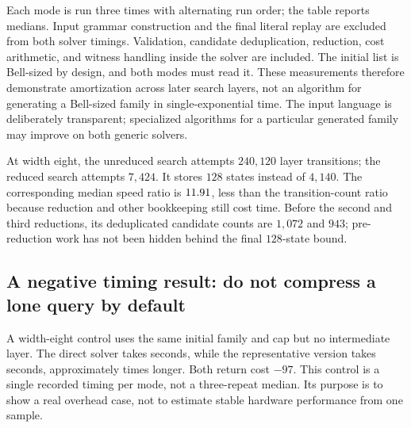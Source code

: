 \documentclass[11pt,a4paper]{article}
\theoremstyle{definition}
\theoremstyle{remark}
\begin{document}
Each mode is run three times with alternating run order; the table reports medians.
Input grammar construction and the final literal replay are excluded from both solver
timings. Validation, candidate deduplication, reduction, cost arithmetic, and witness
handling inside the solver are included. The initial list is Bell-sized by design,
and both modes must read it. These measurements therefore demonstrate amortization
across later search layers, not an algorithm for generating a Bell-sized family in
single-exponential time. The input language is deliberately transparent; specialized
algorithms for a particular generated family may improve on both generic solvers.

\begin{table}[htbp]
\centering\small

\caption{Paired complete abstract-grammar search. The ratio is exact median time
divided by reduced median time. Reduced-state counts are the stored counts at each
of the three stages on these inputs. These are not native recognizer speedups.}
\label{tab:time}
\end{table}

\begin{table}[htbp]
\centering\small

\caption{Deterministic work counters for the same experiments. The two solvers agree
on the optimum. Every returned reduced witness replays to one orientable surface
with Euler characteristic one and one boundary circle.}
\label{tab:work}
\end{table}

At width eight, the unreduced search attempts $240{,}120$ layer transitions; the
reduced search attempts $7{,}424$. It stores $128$ states instead of $4{,}140$.
The corresponding median speed ratio is $11.91$, less than the transition-count
ratio because reduction and other bookkeeping still cost time. Before the second
and third reductions, its deduplicated candidate counts are $1{,}072$ and $943$;
pre-reduction work has not been hidden behind the final $128$-state bound.

\subsection{A negative timing result: do not compress a lone query by default}
A width-eight control uses the same initial family and cap but no intermediate layer.
The direct solver takes \ControlExact{} seconds, while the representative version
takes \ControlReduced{} seconds, approximately \ControlSlowdown{} times longer.
Both return cost $-97$. This control is a single recorded timing per mode, not a
three-repeat median. Its purpose is to show a real overhead case, not to estimate
stable hardware performance from one sample.
\end{document}

